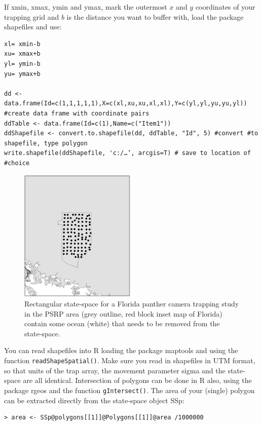 If xmin, xmax, ymin and ymax, mark the outermost $x$ and $y$ coordinates of your trapping grid and $b$ is the distance you want to buffer with, load the package shapefiles \citep{stabler:2006} and use:
\begin{verbatim}
xl= xmin-b
xu= xmax+b
yl= ymin-b
yu= ymax+b

dd <- data.frame(Id=c(1,1,1,1,1),X=c(xl,xu,xu,xl,xl),Y=c(yl,yl,yu,yu,yl)) #create data frame with coordinate pairs
ddTable <- data.frame(Id=c(1),Name=c("Item1"))
ddShapefile <- convert.to.shapefile(dd, ddTable, "Id", 5) #convert #to shapefile, type polygon
write.shapefile(ddShapefile, 'c:/…’, arcgis=T) # save to location of #choice
\end{verbatim}


\begin{figure}
\begin{center}
\includegraphics[height=2.5in]{Ch6/figs/panthercamera}
\end{center}
\caption{Rectangular state-space for a Florida panther camera trapping
study in the PSRP area (grey outline, red block inset map of Florida)
contain some ocean (white) that needs to be removed from the state-space.}
\label{pantercamera.fig}
\end{figure}

You can read shapefiles into R loading the package maptools
\citep{lewin-koh_etal:2011} and using the function
\verb#readShapeSpatial()#. Make sure you read in shapefiles in UTM format, so
that units of the trap array, the movement parameter sigma and the
state-space are all identical.  Intersection of polygons can be done
in R also, using the package rgeos \citep{bivand_rundel:2011} and the
function \verb#gIntersect()#. The area of your (single) polygon can be
extracted directly from the state-space object SSp:

\begin{verbatim}
> area <- SSp@polygons[[1]]@Polygons[[1]]@area /1000000
\end{verbatim}

